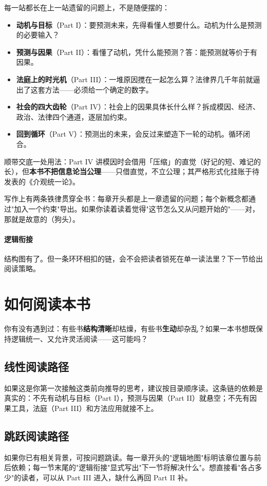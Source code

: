 \documentclass[../../main2.tex]{subfiles}
\begin{document}
	每一站都长在上一站遗留的问题上，不是随便摆的：
	\begin{itemize}
		\item \textbf{动机与目标}（Part I）：要预测未来，先得看懂人想要什么。动机为什么是预测的必要输入？
		\item \textbf{预测与因果}（Part II）：看懂了动机，凭什么能预测？答：能预测就等价于有因果。
		\item \textbf{法庭上的时光机}（Part III）：一堆原因搅在一起怎么算？法律界几千年前就逼出了这套方法——必须给一个确定的数字。
		\item \textbf{社会的四大齿轮}（Part IV）：社会上的因果具体长什么样？拆成模因、经济、政治、法律四个通道，逐层加约束。
		\item \textbf{回到循环}（Part V）：预测出的未来，会反过来塑造下一轮的动机。循环闭合。
	\end{itemize}

	顺带交底一处用法：Part IV 讲模因时会借用「压缩」的直觉（好记的短、难记的长），但\textbf{本书不把信息论当公理}——只借直觉，不立公理；其严格形式化挂账于待发表的《介观统一论》。

	写作上有两条铁律贯穿全书：每章开头都是上一章遗留的问题；每个新概念都通过"加入一个约束"导出。如果你读着读着觉得"这节怎么又从问题开始的"——对，那就是故意的（狗头）。

	\paragraph*{逻辑衔接}
	结构图有了。但一条环环相扣的链，会不会把读者锁死在单一读法里？下一节给出阅读策略。

	\section{如何阅读本书}

	你有没有遇到过：有些书\textbf{结构清晰}却枯燥，有些书\textbf{生动}却杂乱？如果一本书想既保持逻辑统一、又允许灵活阅读——这可能吗？

	\subsection{线性阅读路径}
	如果这是你第一次接触这类前向推导的思考，建议按目录顺序读。这条链的依赖是真实的：不先有动机与目标（Part I），预测与因果（Part II）就悬空；不先有因果工具，法庭（Part III）和方法应用就接不上。

	\subsection{跳跃阅读路径}
	如果你已有相关背景，可按问题跳读。每一章开头的"逻辑地图"标明该章位置与前后依赖；每一节末尾的"逻辑衔接"显式写出"下一节将解决什么"。想直接看"各占多少"的读者，可以从 Part III 进入，缺什么再回 Part II 补。
\end{document}

